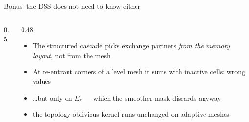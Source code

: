 \documentclass{beamer}
\begin{document}
\begin{frame}{Bonus: the DSS does not need to know either}
    \begin{columns}[c]
        \begin{column}{0.5\textwidth}
            \centering
            \resizebox{\textwidth}{!}{}
        \end{column}
        \begin{column}{0.48\textwidth}
            \small
            \begin{itemize}
                \item The structured cascade picks exchange partners \emph{from the memory layout}, not from the mesh
                \item At re-entrant corners of a level mesh it sums with inactive cells: \alert{wrong values} \pause
                \item \dots but only on $E_\ell$ --- which the smoother mask discards anyway
                \item[$\Rightarrow$] the \alert{topology-oblivious} kernel runs unchanged on adaptive meshes
            \end{itemize}
        \end{column}
    \end{columns}
\end{frame}
\end{document}
